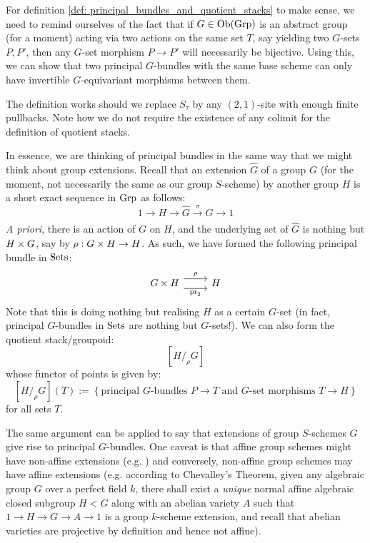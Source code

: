             \begin{remark}
                For definition \ref{def: principal_bundles_and_quotient_stacks} to make sense, we need to remind ourselves of the fact that if $G \in \mathrm{Ob}(\mathrm{Grp})$ is an abstract group (for a moment) acting via two actions on the same set $T$, say yielding two $G$-sets $P, P'$, then any $G$-set morphism $P \to P'$ will necessarily be bijective. Using this, we can show that two principal $G$-bundles with the same base scheme can only have invertible $G$-equivariant morphisms between them. 
            \end{remark}
            \begin{remark}
                The definition works should we replace $S_{\tau}$ by any $(2, 1)$-site with enough finite pullbacks. Note how we do not require the existence of any colimit for the definition of quotient stacks. 
            \end{remark}
            \begin{example}
                In essence, we are thinking of principal bundles in the same way that we might think about group extensions. Recall that an extension $\hat{G}$ of a group $G$ (for the moment, not necessarily the same as our group $S$-scheme) by another group $H$ is a short exact sequence in $\mathrm{Grp}$ as follows:
                    $$1 \to H \to \hat{G} \xrightarrow[]{\pi} G \to 1$$
                \textit{A priori}, there is an action of $G$ on $H$, and the underlying set of $\hat{G}$ is nothing but $H \x G$, say by $\rho: G \x H \to H$. As such, we have formed the following principal bundle in $\mathrm{Sets}$:
                    $$
                        \begin{tikzcd}
                    	{G \x H} & H
                    	\arrow["\rho", shift left=2, from=1-1, to=1-2]
                    	\arrow["{\pr_2}"', shift right=2, from=1-1, to=1-2]
                        \end{tikzcd}
                    $$
                Note that this is doing nothing but realising $H$ as a certain $G$-set (in fact, principal $G$-bundles in $\mathrm{Sets}$ are nothing but $G$-sets!). We can also form the quotient stack/groupoid:
                    $$[H /_{\rho} G]$$
                whose functor of points is given by:
                    $$[H /_{\rho} G](T) := \left\{ \text{principal $G$-bundles $P \to T$ and $G$-set morphisms $T \to H$} \right\}$$
                for all sets $T$.

                The same argument can be applied to say that extensions of group $S$-schemes $G$ give rise to principal $G$-bundles. One caveat is that affine group schemes might have non-affine extensions (e.g. ) and conversely, non-affine group schemes may have affine extensions (e.g. according to Chevalley's Theorem, given any algebraic group $G$ over a perfect field $k$, there shall exist a \textit{unique} normal affine algebraic closed subgroup $H < G$ along with an abelian variety $A$ such that $1 \to H \to G \to A \to 1$ is a group $k$-scheme extension, and recall that abelian varieties are projective by definition and hence not affine).
            \end{example}
            
